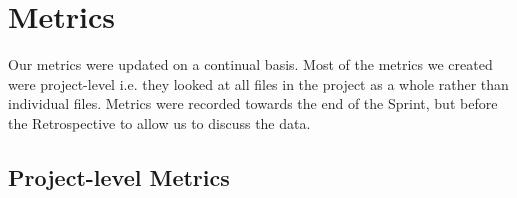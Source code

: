 \documentclass[12pt]{article}
\begin{document}
\newpage

\section{Metrics}

Our metrics were updated on a continual basis. Most of the metrics we created were project-level i.e. they looked at all files in the project as a whole rather than individual files. Metrics were recorded towards the end of the Sprint, but before the Retrospective to allow us to discuss the data.

\subsection{Project-level Metrics}
\end{document}
